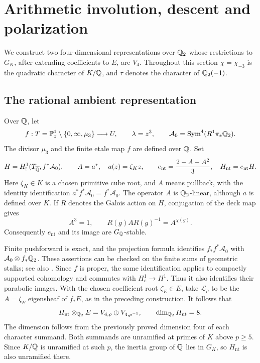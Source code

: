 \section{Arithmetic involution, descent and polarization}\label{sec:descent}

We construct two four-dimensional representations over $\mathbb Q_2$ whose
restrictions to $G_K$, after extending coefficients to $E$, are $V_4$.
Throughout this section $\chi=\chi_{-3}$ is the quadratic character of
$K/\mathbb Q$, and $\tau$ denotes the character of $\mathbb Q_2(-1)$.

\subsection{The rational ambient representation}

Over $\mathbb Q$, let
\[
 f:T=\mathbb P^1_z\setminus\{0,\infty,\mu_3\}\longrightarrow U,
 \qquad \lambda=z^3,
 \qquad \mathcal A_0=\operatorname{Sym}^4(R^1\pi_*\mathbb Q_2).
\]
The divisor $\mu_3$ and the finite etale map $f$ are defined over $\mathbb Q$.
Set
\[
 H=H^1_!(T_{\overline{\mathbb Q}},f^*\mathcal A_0),\qquad
 A=a^*,\quad a(z)=\zeta_Kz,\qquad
 e_{\mathrm{nt}}=\frac{2-A-A^2}{3},\quad
 H_{\mathrm{nt}}=e_{\mathrm{nt}}H.
\]
Here $\zeta_K\in K$ is a chosen primitive cube root, and $A$ means
pullback, with the identity identification $a^*f^*\mathcal A_0=f^*\mathcal A_0$.
The operator $A$ is $\mathbb Q_2$-linear, although $a$ is defined over $K$.
If $R$ denotes the Galois action on $H$, conjugation of the deck map gives
\begin{equation}\label{eq:descent-deck-galois}
 A^3=1,\qquad R(g)AR(g)^{-1}=A^{\chi(g)}.
\end{equation}
Consequently $e_{\mathrm{nt}}$ and its image are $G_\mathbb Q$-stable.

Finite pushforward is exact, and the projection formula identifies
$f_*f^*\mathcal A_0$ with $\mathcal A_0\otimes f_*\mathbb Q_2$.
These assertions can be checked on the finite sums of geometric stalks;
see also \cite[Proposition 59.55.2, tag 03QP]{StacksFinite}.
Since $f$ is proper, the same identification applies to compactly
supported cohomology and commutes with $H_c^1\to H^1$.
Thus it also identifies their parabolic images. With the chosen
coefficient root $\zeta_E\in E$, take $\mathcal L_\rho$ to be the
$A=\zeta_E$ eigensheaf of $f_*E$, as in the preceding construction.
It follows that
\begin{equation}\label{eq:descent-eigenspaces}
 H_{\mathrm{nt}}\otimes_{\mathbb Q_2}E
   =V_{4,\rho}\oplus V_{4,\rho^{-1}},\qquad
 \dim_{\mathbb Q_2}H_{\mathrm{nt}}=8.
\end{equation}
The dimension follows from the previously proved dimension four of
each character summand. Both summands are unramified at primes of $K$
above $p\ge5$. Since $K/\mathbb Q$ is unramified at such $p$, the inertia
group of $\mathbb Q$ lies in $G_K$, so $H_{\mathrm{nt}}$ is also unramified there.

